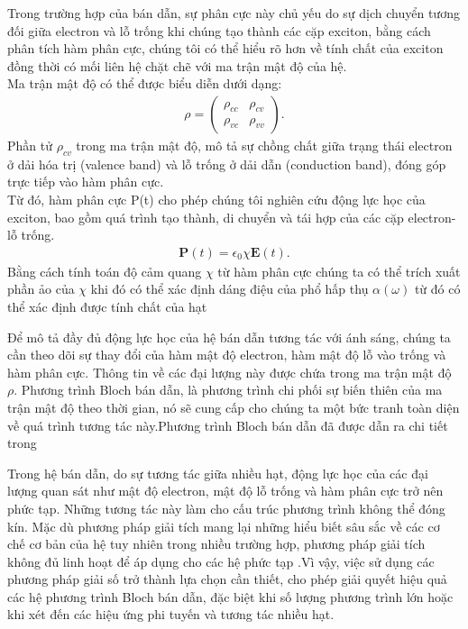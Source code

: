 \documentclass[%
 reprint,
 amsmath,amssymb,
 aps,
]{revtex4-2}
\begin{document}
Trong trường hợp của bán dẫn, sự phân cực này chủ yếu do sự dịch chuyển tương đối giữa electron và lỗ trống khi chúng tạo thành các cặp exciton, bằng cách phân tích hàm phân cực, chúng tôi có thể hiểu rõ hơn về tính chất của exciton đồng thời có mối liên hệ chặt chẽ với ma trận mật độ của hệ.\\
Ma trận mật độ có thể được biểu diễn dưới dạng:
\begin{align*}
	\rho = \begin{pmatrix}
		\rho_{cc} & \rho_{cv} \\
		\rho_{vc} & \rho_{vv}
	\end{pmatrix} .
\end{align*}
 Phần tử $\rho_{cv}$ trong ma trận mật độ, mô tả sự chồng chất giữa trạng thái electron ở dải hóa trị (valence band) và lỗ trống ở dải dẫn (conduction band), đóng góp trực tiếp vào hàm phân cực.\\
 Từ đó, hàm phân cực P(t) cho phép chúng tôi nghiên cứu động lực học của exciton, bao gồm quá trình tạo thành, di chuyển và tái hợp của các cặp electron-lỗ trống. 
 \begin{align}
 	\mathbf{P}(t) = \epsilon_0 \chi \mathbf{E}(t).
 \end{align}
 Bằng cách tính toán độ cảm quang $\chi$ từ hàm phân cực chúng ta có thể trích xuất phần ảo của $\chi$ khi đó có thể xác định dáng điệu của phổ hấp thụ $\alpha{(\omega)}$ từ đó có thể xác định được tính chất của hạt
 
Để mô tả đầy đủ động lực học của hệ bán dẫn tương tác với ánh sáng, chúng ta cần theo dõi sự thay đổi của hàm mật độ electron, hàm mật độ lỗ vào trống và hàm phân cực. Thông tin về các đại lượng này được chứa trong ma trận mật độ $\rho$. Phương trình Bloch bán dẫn, là phương trình chi phối sự biến thiên của ma trận mật độ theo thời gian, nó sẽ cung cấp cho chúng ta một bức tranh toàn diện về quá trình tương tác này.Phương trình Bloch bán dẫn đã được dẫn ra chi tiết trong \cite{doi:10.1142/7184}

Trong hệ bán dẫn, do sự tương tác giữa nhiều hạt, động lực học của các đại lượng quan sát như mật độ electron, mật độ lỗ trống và hàm phân cực trở nên phức tạp. Những tương tác này làm cho cấu trúc phương trình không thể đóng kín. Mặc dù phương pháp giải tích mang lại những hiểu biết sâu sắc về các cơ chế cơ bản của hệ tuy nhiên trong nhiều trường hợp, phương pháp giải tích không đủ linh hoạt để áp dụng cho các hệ phức tạp .Vì vậy, việc sử dụng các phương pháp giải số trở thành lựa chọn cần thiết, cho phép giải quyết hiệu quả các hệ phương trình Bloch bán dẫn, đặc biệt khi số lượng phương trình lớn hoặc khi xét đến các hiệu ứng phi tuyến và tương tác nhiều hạt.
\end{document}
